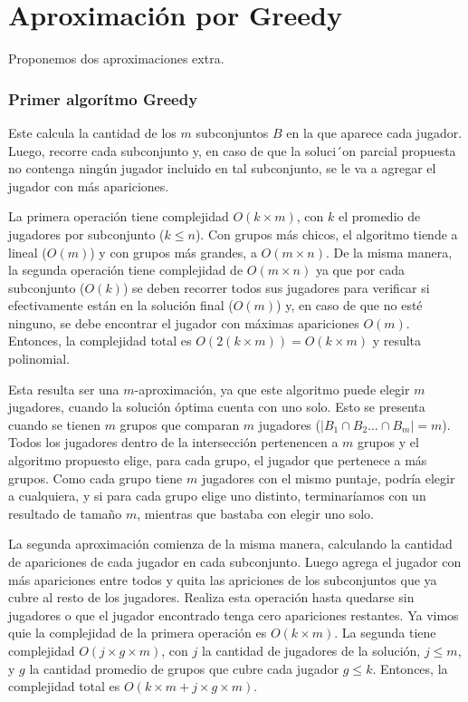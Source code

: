 \section{Aproximación por Greedy}

Proponemos dos aproximaciones extra.

\subsubsection{Primer algorítmo Greedy}

Este calcula la cantidad de los $m$ subconjuntos $B$ en la que aparece cada jugador. Luego, recorre cada subconjunto y, en caso de que la soluci´on parcial propuesta no contenga ningún jugador incluido en tal subconjunto, se le va a agregar el jugador con más apariciones. 

La primera operación tiene complejidad $O(k \times m)$, con $k$ el promedio de jugadores por subconjunto ($k \leq n$). Con grupos más chicos, el algoritmo tiende a lineal ($O(m)$) y con grupos más grandes, a $O(m\times n)$. 
De la misma manera, la segunda operación tiene complejidad de  $O(m\times n)$ ya que por cada subconjunto ($O(k)$) se deben recorrer todos sus jugadores para verificar si efectivamente están en la solución final ($O(m)$) y, en caso de que no esté ninguno, se debe encontrar el jugador con máximas apariciones $O(m)$. Entonces, la complejidad total es $O(2(k \times m))=O(k \times m)$ y resulta polinomial.

Esta resulta ser una $m$-aproximación, ya que este algoritmo puede elegir $m$ jugadores, cuando la solución óptima cuenta con uno solo. Esto se presenta cuando se tienen $m$ grupos que comparan $m$ jugadores ($\left|B_1 \cap B_2 \dots \cap B_m\right| = m$). Todos los jugadores dentro de la intersección pertenencen a $m$ grupos y el algoritmo propuesto elige, para cada grupo, el jugador que pertenece a más grupos. Como cada grupo tiene $m$ jugadores con el mismo puntaje, podría elegir a cualquiera, y si para cada grupo elige uno distinto, terminaríamos con un resultado de tamaño $m$, mientras que bastaba con elegir uno solo.

La segunda aproximación comienza de la misma manera, calculando la cantidad de apariciones de cada jugador en cada subconjunto. Luego agrega el jugador con más apariciones entre todos y quita las apriciones de los subconjuntos que ya cubre al resto de los jugadores. Realiza esta operación hasta quedarse sin jugadores o que el jugador encontrado tenga cero apariciones restantes. Ya vimos quie la complejidad de la primera operación es $O(k \times m)$. La segunda tiene complejidad $O(j \times g \times m)$, con $j$ la cantidad de jugadores de la solución, $j \leq m$, y $g$ la cantidad promedio de grupos que cubre cada jugador $g \leq k$. Entonces, la complejidad total es $O(k \times m + j \times g \times m)$. %

    